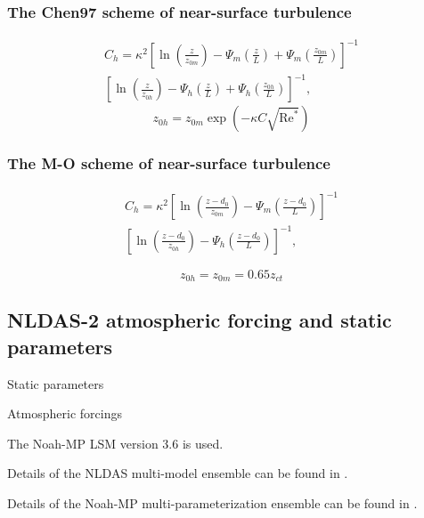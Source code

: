 \documentclass[essd]{copernicus}
\begin{document}
\subsubsection{The Chen97 scheme of near-surface turbulence}

\begin{multline}
    C_h = \kappa^2 \left[ \ln\left(\frac{z}{z_{0m}}\right)
        - \Psi_{m}\left(\frac{z}{L}\right)
        + \Psi_{m}\left(\frac{z_{0m}}{L}\right) \right]^{-1} \\
    \left[ \ln\left(\frac{z}{z_{0h}}\right)
        - \Psi_{h}\left(\frac{z}{L}\right)
        + \Psi_{h}\left(\frac{z_{0h}}{L}\right) \right]^{-1} \text{,}
\end{multline}
\begin{equation}
    z_{0h} = z_{0m} \exp\left(-\kappa C \sqrt{\text{Re}^*}\right)
\end{equation}

\subsubsection{The M-O scheme of near-surface turbulence}

\begin{multline}
    C_h = \kappa^2 \left[ \ln\left(\frac{z-d_0}{z_{0m}}\right)
        - \Psi_{m}\left(\frac{z-d_0}{L}\right) \right]^{-1} \\
    \left[ \ln\left(\frac{z-d_0}{z_{0h}}\right)
        - \Psi_{h}\left(\frac{z-d_0}{L}\right) \right]^{-1}
    \text{,}
\end{multline}

\begin{equation}
    z_{0h} = z_{0m} = 0.65 z_{ct}
\end{equation}


\subsection{NLDAS-2 atmospheric forcing and static parameters}\label{sec:data:nldas}

Static parameters

Atmospheric forcings

The Noah-MP LSM version 3.6 is used.

Details of the NLDAS multi-model ensemble can be found in \citet{xia2012JGRA,
xia2012JGRAa, fei2021WRR}.

Details of the Noah-MP multi-parameterization ensemble can be found in
\citet{zheng2019WRR, zheng2020JAMES, fei2021WRR}.
\end{document}
